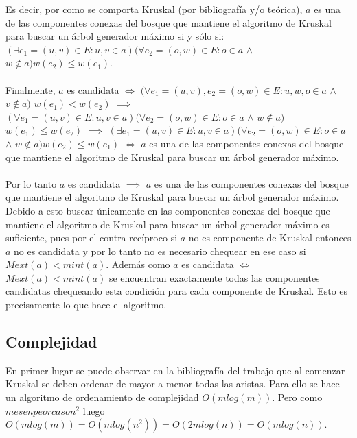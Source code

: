 \documentclass[a4paper]{article}
\begin{document}
Es decir, por como se comporta Kruskal (por bibliografía y/o teórica), $a$ es una de las componentes conexas del bosque que mantiene el algoritmo de Kruskal para buscar un árbol generador máximo si y sólo si:
$(\exists e_1 = (u,v) \in E : u,v \in a) (\forall e_2 = (o, w) \in E : o \in a $  $\land$ $ w \notin a) w(e_2)\leq w(e_1) $.
\\
\\
Finalmente, $a$ es candidata $\iff$  $(\forall e_1 = (u,v), e_2 = (o, w) \in E : u, w, o \in a $  $\land$ $ v \notin a)$ 
$ w(e_1) < w(e_2) $ $ \implies $ $(\forall e_1 = (u,v) \in E : u,v \in a) (\forall e_2 = (o, w) \in E : o \in a $  $\land$ $ w \notin a)$ 
$ w(e_1) \leq w(e_2) $ $ \implies $ $(\exists e_1 = (u,v) \in E : u,v \in a) (\forall e_2 = (o, w) \in E : o \in a $  $\land$ $ w \notin a) w(e_2)\leq w(e_1) $ $\iff$ $a$ es una de las componentes conexas del bosque que mantiene el algoritmo de Kruskal para buscar un árbol generador máximo.
\\
\\
Por lo tanto $a$ es candidata $ \implies $ $a$ es una de las componentes conexas del bosque que mantiene el algoritmo de Kruskal para buscar un árbol generador máximo. Debido a esto buscar únicamente en las componentes conexas del bosque que mantiene el algoritmo de Kruskal para buscar un árbol generador máximo es suficiente, pues por el contra recíproco si $a$ no es componente de Kruskal entonces $a$ no es candidata y por lo tanto no es necesario chequear en ese caso si $Mext(a) < mint(a)$. Además como $a$ es candidata $\iff$ $Mext(a) < mint(a)$ se encuentran exactamente todas las componentes candidatas chequeando esta condición para cada componente de Kruskal. Esto es precisamente lo que hace el algoritmo.




\subsection{Complejidad}

En primer lugar se puede observar en la bibliografía del trabajo que al comenzar Kruskal se deben ordenar de mayor a menor todas las aristas. Para ello se hace un algoritmo de ordenamiento de complejidad $O(mlog(m))$. Pero como $m es en peor caso n^2$ luego $O(mlog(m)) = O(mlog(n^2)) = O(2mlog(n)) = O(mlog(n))$. 
\end{document}
